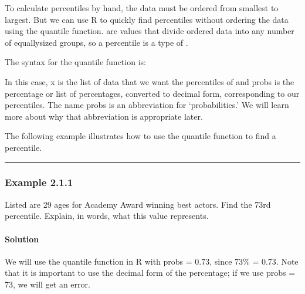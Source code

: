 \documentclass[letterpaper,10pt,english]{jupyterBook}
\begin{document}
\sphinxAtStartPar
To calculate percentiles by hand, the data must be ordered from smallest to largest. But we can use R to quickly find percentiles without ordering the data using the quantile function.  are values that divide ordered data into any number of equally\sphinxhyphen{}sized groups, so a percentile is a type of .

\sphinxAtStartPar
The syntax for the quantile function is:

\begin{sphinxVerbatim}[commandchars=\\\{\}]
\end{sphinxVerbatim}

\sphinxAtStartPar
In this case, x is the list of data that we want the percentiles of and probs is the percentage or list of percentages, converted to decimal form, corresponding to our percentiles. The name probs is an abbreviation for ‘probabilities.’ We will learn more about why that abbreviation is appropriate later.

\sphinxAtStartPar
The following example illustrates how to use the quantile function to find a percentile.


\bigskip\hrule\bigskip



\subsubsection{Example 2.1.1}
\label{\detokenize{Ch2 Descriptive Statistics/2.1 Measures of Position:example-2-1-1}}
\sphinxAtStartPar
Listed are 29 ages for Academy Award winning best actors. Find the 73rd percentile. Explain, in words, what this value represents.




\paragraph{Solution}
\label{\detokenize{Ch2 Descriptive Statistics/2.1 Measures of Position:solution}}
\sphinxAtStartPar
We will use the quantile function in R with probs = 0.73, since 73\% = 0.73. Note that it is important to use the decimal form of the percentage; if we use probs = 73, we will get an error.
\end{document}
